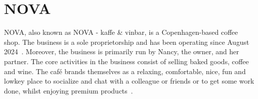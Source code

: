 \section{NOVA}\label{sec:nova}

NOVA, also known as NOVA - kaffe \& vinbar, is a Copenhagen-based coffee shop. %
The business is a sole proprietorship and has been operating since August 2024~\cite{cvr2024}.
Moreover, the business is primarily run by Nancy, the owner, and her partner.
The core activities in the business consist of selling baked goods, coffee and wine.
The café brands themselves as a relaxing, comfortable, nice, fun and lowkey place to socialize and chat with a colleague
or friends or to get some work done, whilst enjoying premium products~\cite{instagram2024}.
